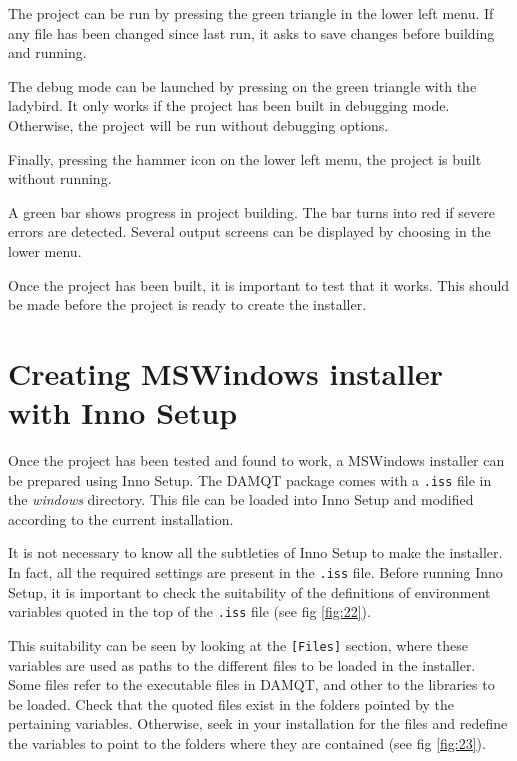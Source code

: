 \documentclass[a4paper,10pt]{article}
\begin{document}
The project can be run by pressing the green triangle in the lower left menu. If any file has
been changed since last run, it asks to save changes before building and running.

The debug mode can be launched by pressing on the green triangle with the ladybird. It only works if
the project has been built in debugging mode. Otherwise, the project will be run without debugging options.

Finally, pressing the hammer icon on the lower left menu, the project is built without running. 

A green bar shows progress in project building. The bar turns into red if severe errors are detected.
Several output screens can be displayed by choosing in the lower menu.

Once the project has been built, it is important to test that it works. This should be made before
the project is ready to create the installer. 



\section{Creating MSWindows installer with Inno Setup}

Once the project has been tested and found to work, a MSWindows installer can be prepared using Inno Setup.
The DAMQT package comes with a \texttt{.iss} file in the {\it windows} directory. This file can be loaded
into Inno Setup and modified according to the current installation.

It is not necessary to know all the subtleties of Inno Setup to make the installer. In fact, all the
required settings are present in the \texttt{.iss} file. Before running Inno Setup, it is important to check 
the suitability of the definitions of environment variables quoted in the top of the \texttt{.iss} file
(see fig \ref{fig:22}).

This suitability can be seen by looking at the \texttt{[Files]} section, where these variables are used 
as paths to the different files to be loaded in the installer. Some files refer to the executable files
in DAMQT, and other to the libraries to be loaded. Check that the quoted files exist in the
folders pointed by the pertaining variables. Otherwise, seek in your installation for the files and 
redefine the variables to point to the folders where they are contained (see fig \ref{fig:23}).
\end{document}
